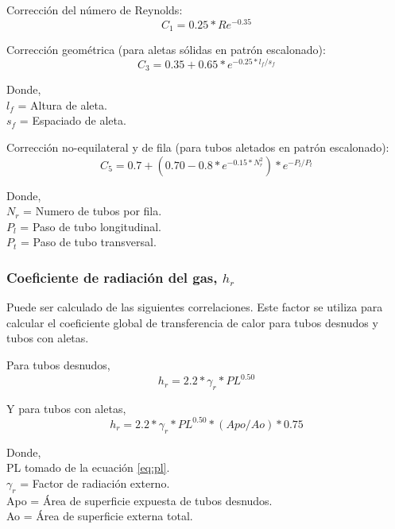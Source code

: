 \par Corrección del número de Reynolds:
\begin{equation*}
C_1 = 0.25 *Re^{-0.35}
\end{equation*}

\par Corrección geométrica (para aletas sólidas en patrón escalonado):
\begin{equation*}
C_3 = 0.35 +0.65 *e^{-0.25*l_f/s_f}
\end{equation*}
\par Donde, \\
$l_f$ = Altura de aleta. \\
$s_f$ = Espaciado de aleta.\\

\par Corrección no-equilateral y de fila (para tubos aletados en patrón escalonado):
\begin{equation*}
C_5 = 0.7 +(0.70 -0.8 *e^{-0.15 *N_r^2}) *e^{-P_l/P_t}
\end{equation*}
\par Donde, \\
$N_r$ = Numero de tubos por fila. \\
$P_l$ = Paso de tubo longitudinal.\\
$P_t$ = Paso de tubo transversal. \\

\subsubsection{Coeficiente de radiación del gas, $h_r$}
\par Puede ser calculado de las siguientes correlaciones. Este factor se utiliza para calcular el coeficiente global de transferencia de calor para tubos desnudos y tubos con aletas. 

Para tubos desnudos,
\begin{equation*}
h_r = 2.2 *\gamma_r *PL^{0.50}
\end{equation*}

\par Y para tubos con aletas,
\begin{equation*}
h_r = 2.2 *\gamma_r *PL^{0.50} *(Apo/Ao) *0.75
\end{equation*}

\par Donde,\\
PL tomado de la ecuación \ref{eq:pl}.\\
$\gamma_r$ = Factor de radiación externo.\\
Apo = Área de superficie expuesta de tubos desnudos.\\
Ao = Área de superficie externa total. \\


